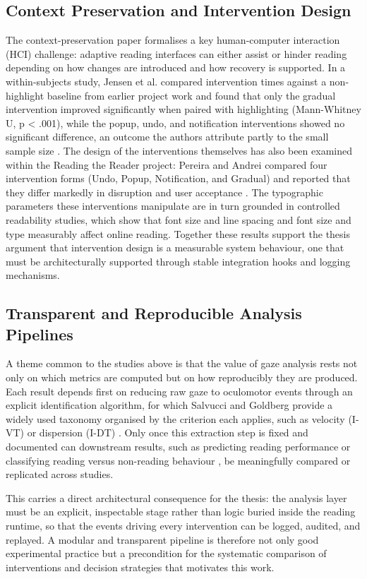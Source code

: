 \subsection{Context Preservation and Intervention Design}
\label{subsec:related-context-preservation}
The context-preservation paper formalises a key human-computer interaction (HCI) challenge: adaptive reading interfaces can either assist or hinder reading depending on how changes are introduced and how recovery is supported.
In a within-subjects study, Jensen et al. compared intervention times against a non-highlight baseline from earlier project work \cite{pereira2024typography} and found that only the gradual intervention improved significantly when paired with highlighting (Mann-Whitney U, p < .001), while the popup, undo, and notification interventions showed no significant difference, an outcome the authors attribute partly to the small sample size \cite{jensen2025context}.
The design of the interventions themselves has also been examined within the Reading the Reader project: Pereira and Andrei compared four intervention forms (Undo, Popup, Notification, and Gradual) and reported that they differ markedly in disruption and user acceptance \cite{pereira2024typography}.
The typographic parameters these interventions manipulate are in turn grounded in controlled readability studies, which show that font size and line spacing \cite{rello2016makeitbig} and font size and type \cite{beymer2008eyetracking} measurably affect online reading.
Together these results support the thesis argument that intervention design is a measurable system behaviour, one that must be architecturally supported through stable integration hooks and logging mechanisms.

\subsection{Transparent and Reproducible Analysis Pipelines}
\label{subsec:related-reading-analytics}
A theme common to the studies above is that the value of gaze analysis rests not only on which metrics are computed but on how reproducibly they are produced.
Each result depends first on reducing raw gaze to oculomotor events through an explicit identification algorithm, for which Salvucci and Goldberg provide a widely used taxonomy organised by the criterion each applies, such as velocity (I-VT) or dispersion (I-DT) \cite{salvucci2000identifying}.
Only once this extraction step is fixed and documented can downstream results, such as predicting reading performance \cite{guan2022predictive} or classifying reading versus non-reading behaviour \cite{landsmann2019classification}, be meaningfully compared or replicated across studies.

This carries a direct architectural consequence for the thesis: the analysis layer must be an explicit, inspectable stage rather than logic buried inside the reading runtime, so that the events driving every intervention can be logged, audited, and replayed.
A modular and transparent pipeline is therefore not only good experimental practice but a precondition for the systematic comparison of interventions and decision strategies that motivates this work.
